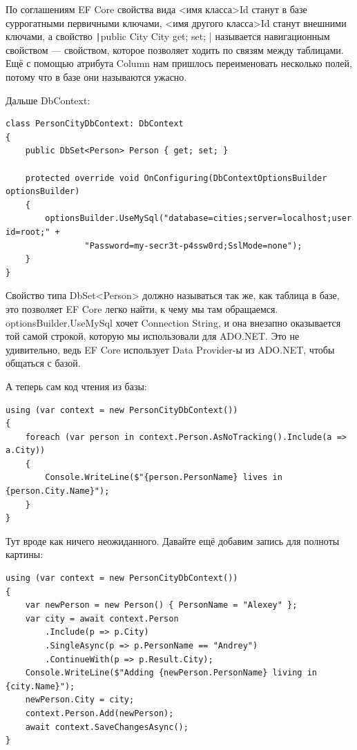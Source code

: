\documentclass[a5paper]{article}
\begin{document}
По соглашениям EF Core свойства вида <имя класса>Id станут в базе суррогатными первичными ключами, <имя другого класса>Id станут внешними ключами, а свойство \texttt|public City City { get; set; }| называется навигационным свойством --- свойством, которое позволяет ходить по связям между таблицами. Ещё с помощью атрибута Column нам пришлось переименовать несколько полей, потому что в базе они называются ужасно.

Дальше DbContext:

\begin{verbatim}
class PersonCityDbContext: DbContext
{
    public DbSet<Person> Person { get; set; }

    protected override void OnConfiguring(DbContextOptionsBuilder optionsBuilder)
    {
        optionsBuilder.UseMySql("database=cities;server=localhost;user id=root;" +
                "Password=my-secr3t-p4ssw0rd;SslMode=none");
    }
}
\end{verbatim}

Свойство типа DbSet<Person> должно называться так же, как таблица в базе, это позволяет EF Core легко найти, к чему мы там обращаемся. optionsBuilder.UseMySql хочет Connection String, и она внезапно оказывается той самой строкой, которую мы использовали для ADO.NET. Это не удивительно, ведь EF Core использует Data Provider-ы из ADO.NET, чтобы общаться с базой.

А теперь сам код чтения из базы:

\begin{verbatim}
using (var context = new PersonCityDbContext())
{
    foreach (var person in context.Person.AsNoTracking().Include(a => a.City))
    {
        Console.WriteLine($"{person.PersonName} lives in {person.City.Name}");
    }
}
\end{verbatim}

Тут вроде как ничего неожиданного. Давайте ещё добавим запись для полноты картины:

\begin{verbatim}
using (var context = new PersonCityDbContext())
{
    var newPerson = new Person() { PersonName = "Alexey" };
    var city = await context.Person
        .Include(p => p.City)
        .SingleAsync(p => p.PersonName == "Andrey")
        .ContinueWith(p => p.Result.City);
    Console.WriteLine($"Adding {newPerson.PersonName} living in {city.Name}");
    newPerson.City = city;
    context.Person.Add(newPerson);
    await context.SaveChangesAsync();
}
\end{verbatim}
\end{document}
